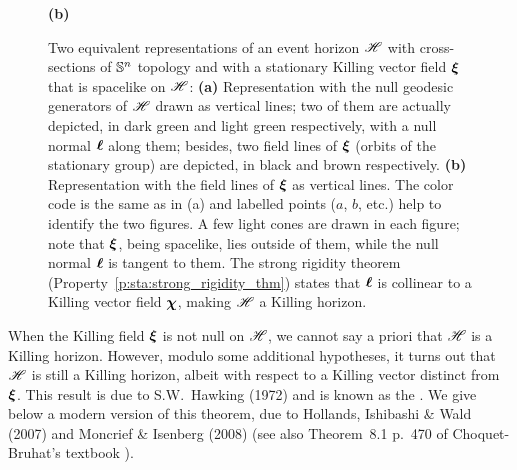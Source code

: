 \begin{figure}
{\textbf{\large (b)}}
\caption[]{\label{f:sta:rot_horizon} \footnotesize
Two equivalent representations of an event horizon $\mathscr{H}$ with cross-sections of $\mathbb{S}^n$ topology
and with a stationary Killing vector field $\bm{\xi}$ that is
spacelike on $\mathscr{H}$:
\textbf{(a)} Representation with the null geodesic generators of $\mathscr{H}$ drawn as vertical
lines; two of them are actually depicted, in dark green and light green
respectively, with a null normal $\bm{\ell}$ along them; besides,
two field lines of $\bm{\xi}$
(orbits of the stationary group) are depicted, in black and brown
respectively.
\textbf{(b)} Representation with the field lines of $\bm{\xi}$ as vertical lines.
The color code is the same as in (a) and
labelled points ($a$, $b$, etc.) help to identify
the two figures. A few light cones are drawn in each figure; note that $\bm{\xi}$,
being spacelike, lies outside of them,
while the null normal $\bm{\ell}$ is tangent to them.
The strong rigidity theorem (Property~\ref{p:sta:strong_rigidity_thm}) states that
$\bm{\ell}$ is collinear to a Killing vector field $\bm{\chi}$, making $\mathscr{H}$
a Killing horizon.}
\end{figure}

When the Killing field $\bm{\xi}$ is not null on $\mathscr{H}$, we cannot say a priori
that $\mathscr{H}$ is a Killing horizon. However, modulo some additional hypotheses,
it turns out that $\mathscr{H}$ is still a Killing horizon, albeit with
respect to a Killing vector distinct from $\bm{\xi}$. This result is due to
S.W.~Hawking (1972)
\cite{Hawki72,HawkiE73} and is known as the
.
We give below a modern version of this theorem, due to
Hollands, Ishibashi \& Wald (2007) \cite{HollaIW07}
and Moncrief \& Isenberg (2008) \cite{MoncrI08} (see also
Theorem~8.1 p.~470 of Choquet-Bruhat's textbook \cite{Choqu09}).


